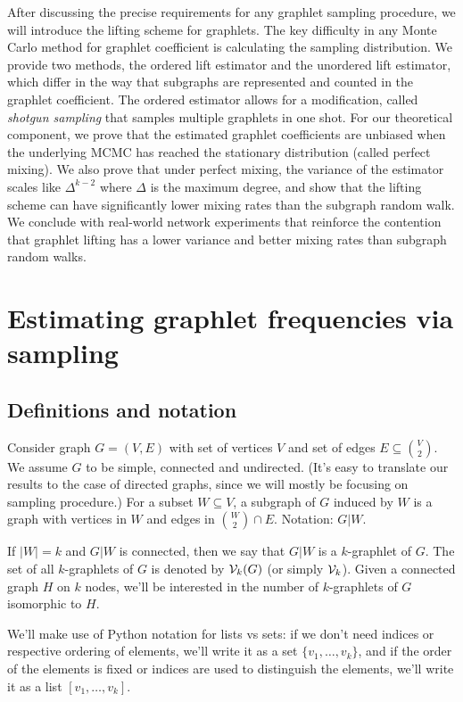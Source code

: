     After discussing the precise requirements for any graphlet sampling procedure, we will introduce the lifting scheme for graphlets.
    The key difficulty in any Monte Carlo method for graphlet coefficient is calculating the sampling distribution.
    We provide two methods, the ordered lift estimator and the unordered lift estimator, which differ in the way that subgraphs are represented and counted in the graphlet coefficient.
    The ordered estimator allows for a modification, called {\em shotgun sampling} that samples multiple graphlets in one shot. 
    For our theoretical component, we prove that the estimated graphlet coefficients are unbiased when the underlying MCMC has reached the stationary distribution (called perfect mixing).
    We also prove that under perfect mixing, the variance of the estimator scales like $\Delta^{k-2}$ where $\Delta$ is the maximum degree, and show that the lifting scheme can have significantly lower mixing rates than the subgraph random walk.
    We conclude with real-world network experiments that reinforce the contention that graphlet lifting has a lower variance and better mixing rates than subgraph random walks.

	\section{Estimating graphlet frequencies via sampling}

	\subsection{Definitions and notation}
	
	Consider graph $G=(V,E)$ with set of vertices $V$ and set of edges $E \subseteq
	\binom{V}{2}$. 
	We assume $G$ to be simple, connected and undirected. 
	(It's easy to translate our results to the case of directed graphs, since we will mostly be 
	focusing on sampling procedure.) 
	For a subset $W \subseteq V$, a subgraph of $G$ induced 
	by $W$ is a graph with vertices in $W$ and edges in $\binom{W}{2}\cap E$. 
	Notation: $G|W$.
	
	If $|W| = k$ and $G|W$ is connected, then we say that $G|W$ is a $k$-graphlet of 
	$G$. The set of all $k$-graphlets of $G$ is denoted by $\mathcal{V}_k(G)$ (or simply $\mathcal{V}_k$).
	Given a connected graph $H$ on $k$ nodes, we'll be interested in the number 
	of $k$-graphlets of $G$ isomorphic to $H$.
	
	We'll make use of Python notation for lists vs sets: if we don't need indices or respective
	ordering of elements, we'll write it as a set $\{v_1, \ldots, v_k\}$, and if the 
	order of the elements is fixed or indices are used to distinguish the elements, we'll write 
	it as a list $[v_1,\ldots, v_k]$. 
	
